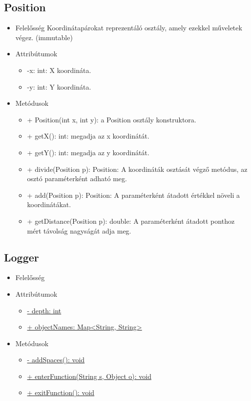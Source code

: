 \subsection{Position}
\begin{itemize}
	\item Felelősség
	Koordinátapárokat reprezentáló osztály, amely ezekkel műveletek végez. (immutable)
	\item Attribútumok
	\begin{itemize}
		\item -x: int: X koordináta.
		\item -y: int: Y koordináta.
	\end{itemize}
	\item Metódusok
	\begin{itemize}
		\item + Position(int x, int y): a Position osztály konstruktora.
		\item + getX(): int: megadja az x koordinátát.
		\item + getY(): int: megadja az y koordinátát.
		\item + divide(Position p): Position: A koordináták osztását végző metódus, az osztó paraméterként adható meg.
		\item + add(Position p): Position: A paraméterként átadott értékkel növeli a koordinátákat.
		\item + getDistance(Position p): double: A paraméterként átadott ponthoz mért távolság nagyságát adja meg.
	\end{itemize}
\end{itemize}

\subsection{Logger}
\begin{itemize}
	\item Felelősség\newline

	\item Attribútumok\newline
	
	\begin{itemize}
		\item \underline{- depth: int}
		\item \underline{+ objectNames: Map<String, String>}
	\end{itemize}
	\item Metódusok
	\begin{itemize}
		\item \underline{- addSpaces(): void}
		\item \underline{+ enterFunction(String s, Object o): void}
		\item \underline{+ exitFunction(): void}
	\end{itemize}
\end{itemize}

